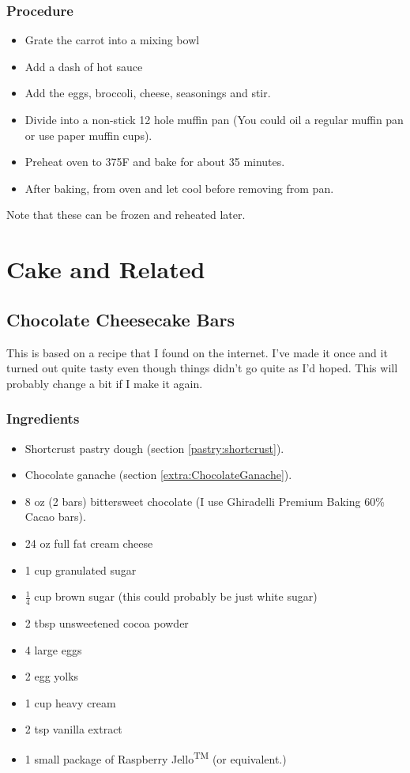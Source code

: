 \documentclass[10pt, openany]{book}
\begin{document}
\subsection{Procedure}
\begin{itemize}
  \item Grate the carrot into a mixing bowl
  \item Add a dash of hot sauce
  \item Add the eggs, broccoli, cheese, seasonings and stir.
  \item Divide into a non-stick 12 hole muffin pan (You could oil a regular muffin pan or use paper muffin cups).
  \item Preheat oven to 375\degree{}F and bake for about 35 minutes.
  \item After baking, from oven and let cool before removing from pan.
\end{itemize}

Note that these can be frozen and reheated later.

\chapter{Cake and Related}

\section{Chocolate Cheesecake Bars}
This is based on a recipe that I found on the internet.  I've made it once and it turned out quite tasty even though things didn't go quite as I'd hoped.  This will probably change a bit if I make it again.
\subsection{Ingredients}
\begin{itemize}
  \item Shortcrust pastry dough (section \ref{pastry:shortcrust}).
  \item Chocolate ganache (section \ref{extra:ChocolateGanache}).
  \item 8 oz (2 bars) bittersweet chocolate (I use Ghiradelli Premium Baking 60\% Cacao bars).
  \item 24 oz full fat cream cheese
  \item 1 cup granulated sugar
  \item $\frac{1}{4}$ cup brown sugar (this could probably be just white sugar)
  \item 2 tbsp unsweetened cocoa powder
  \item 4 large eggs
  \item 2 egg yolks
  \item 1 cup heavy cream
  \item 2 tsp vanilla extract
  \item 1 small package of Raspberry Jello\textsuperscript{TM} (or equivalent.)
\end{itemize}
\end{document}
